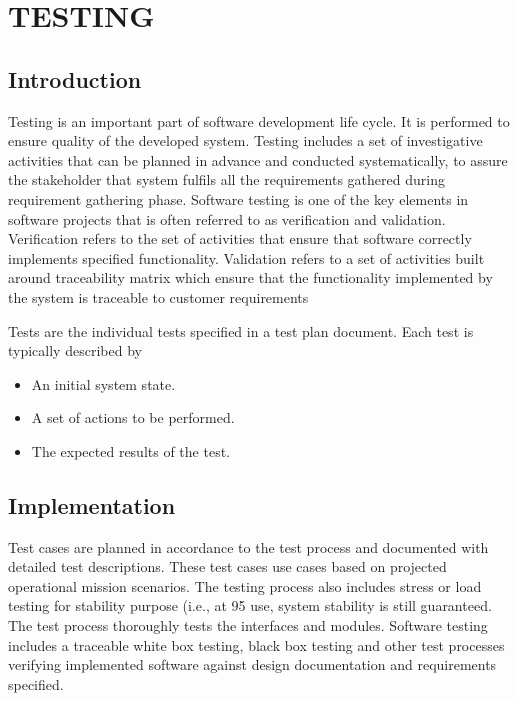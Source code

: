 \documentclass[12pt]{report}
\begin{document}
\vspace{1cm}

\clearpage
\centering
\section{TESTING}
\justifying
\setlength{\parindent}{4em}
\setlength{\parskip}{0.5em}
\renewcommand{\baselinestretch}{1.5}
\normalsize
\subsection{ Introduction}
\hspace{1.7 cm}Testing is an important part of software development life cycle. It is performed to ensure 
quality of the developed system. Testing includes a set of investigative activities that can be 
planned in advance and conducted systematically, to assure the stakeholder that system 
fulfils all the requirements gathered during requirement gathering phase. Software testing is 
one of the key elements in software projects that is often referred to as verification and 
validation. Verification refers to the set of activities that ensure that software correctly 
implements specified functionality. Validation refers to a set of activities built around 
traceability matrix which ensure that the functionality implemented by the system is 
traceable to customer requirements

Tests are the individual tests specified in a test plan document. Each test is typically 
described by
\begin{itemize}
\item An initial system state.
\item A set of actions to be performed.
\item The expected results of the test.
\end{itemize}

\subsection{ Implementation}
\justifying
\setlength{\parindent}{4em}
\setlength{\parskip}{0.5em}
\renewcommand{\baselinestretch}{1.5}
\normalsize

Test cases are planned in accordance to the test process and documented with detailed test 
descriptions. These test cases use cases based on projected operational mission scenarios. 
The testing process also includes stress or load testing for stability purpose (i.e., at 95%
use, system stability is still guaranteed. The test process thoroughly tests the interfaces and 
modules. Software testing includes a traceable white box testing, black box testing and other 
test processes verifying implemented software against design documentation and 
requirements specified.
\end{document}
